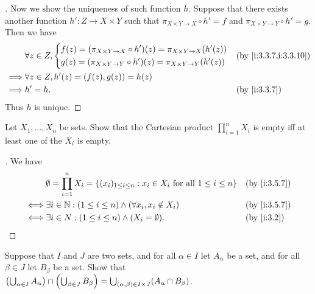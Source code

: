 \begin{proof}[]
  Now we show the uniqueness of such function \(h\).
  Suppose that there exists another function \(h' : Z \to X \times Y\) such that \(\pi_{X \times Y \to X} \circ h' = f\) and \(\pi_{X \times Y \to Y} \circ h' = g\).
  Then we have
  \begin{align*}
             & \forall z \in Z, \begin{dcases}
                                  f(z) = \pa{\pi_{X \times Y \to X} \circ h'}(z) = \pi_{X \times Y \to X}\pa{h'(z)} \\
                                  g(z) = \pa{\pi_{X \times Y \to Y} \circ h'}(z) = \pi_{X \times Y \to Y}\pa{h'(z)}
                                \end{dcases} &  & \by{i:3.3.7,i:3.3.10}     \\
    \implies & \forall z \in Z, h'(z) = (f(z), g(z)) = h(z)                                                            \\
    \implies & h' = h.                                                                               &  & \by{i:3.3.7}
  \end{align*}
  Thus \(h\) is unique.
\end{proof}

\begin{ex}\label{i:ex:3.5.8}
  Let \(X_1, \dots, X_n\) be sets.
  Show that the Cartesian product \(\prod_{i = 1}^n X_i\) is empty iff at least one of the \(X_i\) is empty.
\end{ex}

\begin{proof}[]
  We have
  \begin{align*}
         & \emptyset = \prod_{i = 1}^n X_i = \set{(x_i)_{1 \leq i \leq n} : x_i \in X_i \text{ for all } 1 \leq i \leq n} &  & \by{i:3.5.7} \\
    \iff & \exists i \in \N : (1 \leq i \leq n) \land (\forall x_i, x_i \notin X_i)                                       &  & \by{i:3.5.7} \\
    \iff & \exists i \in N : (1 \leq i \leq n) \land (X_i = \emptyset).                                                   &  & \by{i:3.2}
  \end{align*}
\end{proof}

\begin{ex}\label{i:ex:3.5.9}
  Suppose that \(I\) and \(J\) are two sets, and for all \(\alpha \in I\) let \(A_\alpha\) be a set, and for all \(\beta \in J\) let \(B_\beta\) be a set.
  Show that \(\left\lparen\bigcup_{\alpha \in I} A_\alpha\right\rparen \cap \left\lparen\bigcup_{\beta \in J} B_\beta\right\rparen = \bigcup_{(\alpha, \beta) \in I \times J} (A_\alpha \cap B_\beta)\).
\end{ex}

